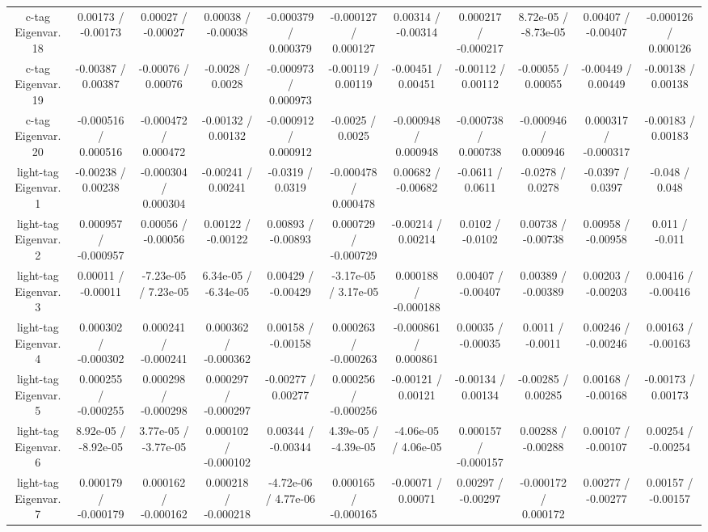 \begin{table}[htbp]
\begin{center}
\begin{tabular}{|c|c|c|c|c|c|c|c|c|c|c|}
  c-tag Eigenvar. 18 & 0.00173 / -0.00173 & 0.00027 / -0.00027 & 0.00038 / -0.00038 & -0.000379 / 0.000379 & -0.000127 / 0.000127 & 0.00314 / -0.00314 & 0.000217 / -0.000217 & 8.72e-05 / -8.73e-05 & 0.00407 / -0.00407 & -0.000126 / 0.000126 \\ 
  c-tag Eigenvar. 19 & -0.00387 / 0.00387 & -0.00076 / 0.00076 & -0.0028 / 0.0028 & -0.000973 / 0.000973 & -0.00119 / 0.00119 & -0.00451 / 0.00451 & -0.00112 / 0.00112 & -0.00055 / 0.00055 & -0.00449 / 0.00449 & -0.00138 / 0.00138 \\ 
  c-tag Eigenvar. 20 & -0.000516 / 0.000516 & -0.000472 / 0.000472 & -0.00132 / 0.00132 & -0.000912 / 0.000912 & -0.0025 / 0.0025 & -0.000948 / 0.000948 & -0.000738 / 0.000738 & -0.000946 / 0.000946 & 0.000317 / -0.000317 & -0.00183 / 0.00183 \\ 
  light-tag Eigenvar. 1 & -0.00238 / 0.00238 & -0.000304 / 0.000304 & -0.00241 / 0.00241 & -0.0319 / 0.0319 & -0.000478 / 0.000478 & 0.00682 / -0.00682 & -0.0611 / 0.0611 & -0.0278 / 0.0278 & -0.0397 / 0.0397 & -0.048 / 0.048 \\ 
  light-tag Eigenvar. 2 & 0.000957 / -0.000957 & 0.00056 / -0.00056 & 0.00122 / -0.00122 & 0.00893 / -0.00893 & 0.000729 / -0.000729 & -0.00214 / 0.00214 & 0.0102 / -0.0102 & 0.00738 / -0.00738 & 0.00958 / -0.00958 & 0.011 / -0.011 \\ 
  light-tag Eigenvar. 3 & 0.00011 / -0.00011 & -7.23e-05 / 7.23e-05 & 6.34e-05 / -6.34e-05 & 0.00429 / -0.00429 & -3.17e-05 / 3.17e-05 & 0.000188 / -0.000188 & 0.00407 / -0.00407 & 0.00389 / -0.00389 & 0.00203 / -0.00203 & 0.00416 / -0.00416 \\ 
  light-tag Eigenvar. 4 & 0.000302 / -0.000302 & 0.000241 / -0.000241 & 0.000362 / -0.000362 & 0.00158 / -0.00158 & 0.000263 / -0.000263 & -0.000861 / 0.000861 & 0.00035 / -0.00035 & 0.0011 / -0.0011 & 0.00246 / -0.00246 & 0.00163 / -0.00163 \\ 
  light-tag Eigenvar. 5 & 0.000255 / -0.000255 & 0.000298 / -0.000298 & 0.000297 / -0.000297 & -0.00277 / 0.00277 & 0.000256 / -0.000256 & -0.00121 / 0.00121 & -0.00134 / 0.00134 & -0.00285 / 0.00285 & 0.00168 / -0.00168 & -0.00173 / 0.00173 \\ 
  light-tag Eigenvar. 6 & 8.92e-05 / -8.92e-05 & 3.77e-05 / -3.77e-05 & 0.000102 / -0.000102 & 0.00344 / -0.00344 & 4.39e-05 / -4.39e-05 & -4.06e-05 / 4.06e-05 & 0.000157 / -0.000157 & 0.00288 / -0.00288 & 0.00107 / -0.00107 & 0.00254 / -0.00254 \\ 
  light-tag Eigenvar. 7 & 0.000179 / -0.000179 & 0.000162 / -0.000162 & 0.000218 / -0.000218 & -4.72e-06 / 4.77e-06 & 0.000165 / -0.000165 & -0.00071 / 0.00071 & 0.00297 / -0.00297 & -0.000172 / 0.000172 & 0.00277 / -0.00277 & 0.00157 / -0.00157 \\ 

\end{tabular}
\end{center}
\end{table}
